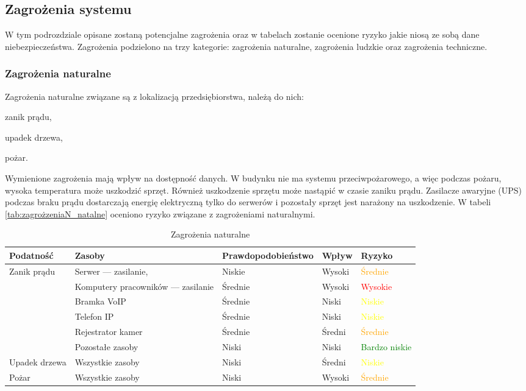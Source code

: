 \subsection{Zagrożenia systemu}
W tym podrozdziale opisane zostaną potencjalne zagrożenia oraz w tabelach zostanie ocenione ryzyko jakie niosą ze sobą dane niebezpieczeństwa. Zagrożenia podzielono na trzy kategorie: zagrożenia naturalne, zagrożenia ludzkie oraz zagrożenia techniczne.

\subsubsection{Zagrożenia naturalne} 
Zagrożenia naturalne związane są z lokalizacją przedsiębiorstwa, należą do nich:
\begin{itemize*}
	\item zanik prądu,
	\item upadek drzewa,
	\item pożar.
\end{itemize*}

Wymienione zagrożenia mają wpływ na dostępność danych. W budynku nie ma systemu przeciwpożarowego, a więc podczas pożaru, wysoka temperatura może uszkodzić sprzęt. Również uszkodzenie sprzętu może nastąpić w czasie zaniku prądu. Zasilacze awaryjne (UPS) podczas braku prądu dostarczają energię elektryczną tylko do serwerów i pozostały sprzęt jest narażony na uszkodzenie. W tabeli \ref{tab:zagrożzeniaN_natalne} oceniono ryzyko związane z zagrożeniami naturalnymi.

\begin{landscape}
\begin{longtable}[ht!]{|m{4cm}|m{6cm}|m{4.5cm}|m{3cm}|m{3cm}|}
	\caption{Zagrożenia naturalne}
	\label{zagrożeniaN_natalne} \\
		\hline	
		\textbf{Podatność} & \textbf{Zasoby} & \textbf{Prawdopodobieństwo} & \textbf{Wpływ} &  \textbf{Ryzyko} \\ \hline
	\multirow{5}{4cm}{Zanik prądu}  
		&   Serwer --- zasilanie,  & Niskie & Wysoki & \textcolor{orange}{Średnie}  \\ \cline{2-5}
		& Komputery pracowników --- zasilanie & Średnie & Wysoki & \textcolor{red}{Wysokie} \\ \cline{2-5}
		& Bramka VoIP & Średnie & Niski & \textcolor{yellow}{Niskie} \\ \cline{2-5}
		& Telefon IP & Średnie & Niski & \textcolor{yellow}{Niskie} \\ \cline{2-5}
		& Rejestrator kamer & Średnie & Średni & \textcolor{orange}{Średnie} \\ \cline{2-5}
		& Pozostałe zasoby & Niski & Niski & \textcolor{green}{Bardzo niskie} \\ \cline{2-5}
	\hline
	Upadek drzewa  
		& Wszystkie zasoby & Niski  & Średni & \textcolor{yellow}{Niskie} \\ \cline{2-5}
	\hline
	Pożar
		& Wszystkie zasoby & Niski  & Wysoki & \textcolor{orange}{Średnie} \\ \cline{2-5}
	\hline
\end{longtable}
\end{landscape}

